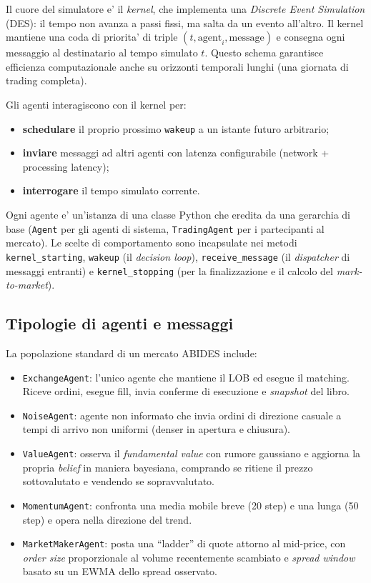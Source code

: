 \documentclass[11pt,a4paper]{article}
\begin{document}
Il cuore del simulatore e' il \emph{kernel}, che implementa una
\emph{Discrete Event Simulation} (DES): il tempo non avanza a passi
fissi, ma salta da un evento all'altro.  Il kernel mantiene una coda
di priorita' di triple
$(t, \text{agent}_i, \text{message})$ e consegna ogni messaggio al
destinatario al tempo simulato $t$.  Questo schema garantisce
efficienza computazionale anche su orizzonti temporali lunghi (una
giornata di trading completa).

Gli agenti interagiscono con il kernel per:
\begin{itemize}
    \item \textbf{schedulare} il proprio prossimo \texttt{wakeup} a un
          istante futuro arbitrario;
    \item \textbf{inviare} messaggi ad altri agenti con latenza
          configurabile (network + processing latency);
    \item \textbf{interrogare} il tempo simulato corrente.
\end{itemize}

Ogni agente e' un'istanza di una classe Python che eredita da una
gerarchia di base (\texttt{Agent} per gli agenti di sistema,
\texttt{TradingAgent} per i partecipanti al mercato).  Le scelte di
comportamento sono incapsulate nei metodi
\texttt{kernel\_starting}, \texttt{wakeup} (il \emph{decision loop}),
\texttt{receive\_message} (il \emph{dispatcher} di messaggi entranti)
e \texttt{kernel\_stopping} (per la finalizzazione e il calcolo del
\emph{mark-to-market}).

\subsection{Tipologie di agenti e messaggi}

La popolazione standard di un mercato ABIDES include:
\begin{itemize}
    \item \texttt{ExchangeAgent}: l'unico agente che mantiene il
          LOB ed esegue il matching.  Riceve ordini, esegue fill,
          invia conferme di esecuzione e \emph{snapshot} del libro.
    \item \texttt{NoiseAgent}: agente non informato che invia ordini
          di direzione casuale a tempi di arrivo non uniformi
          (denser in apertura e chiusura).
    \item \texttt{ValueAgent}: osserva il \emph{fundamental value} con
          rumore gaussiano e aggiorna la propria \emph{belief} in
          maniera bayesiana, comprando se ritiene il prezzo
          sottovalutato e vendendo se sopravvalutato.
    \item \texttt{MomentumAgent}: confronta una media mobile breve
          (20 step) e una lunga (50 step) e opera nella direzione
          del trend.
    \item \texttt{MarketMakerAgent}: posta una ``ladder'' di quote
          attorno al mid-price, con \emph{order size} proporzionale
          al volume recentemente scambiato e \emph{spread window}
          basato su un EWMA dello spread osservato.
\end{itemize}
\end{document}
